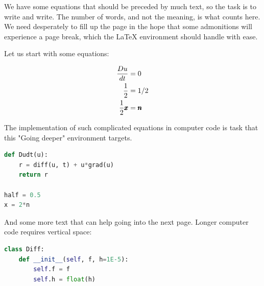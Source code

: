 \documentclass[%
oneside,                 %
final,                   %
10pt]{article}
\newenvironment{noticeshaded}
{\def\FrameCommand{\fboxsep=3mm\colorbox{colors1_notice_background}}
 \MakeFramed {\advance\hsize-\width \FrameRestore}}{\endMakeFramed}
\newenvironment{notice_colors1admon}[1][Notice]{
\begin{noticeshaded}
\noindent
\texttt{[image: latex\_figs/notice]}\ \ \   \textbf{#1}\\ \par
\vspace{-3mm}\nobreak\noindent\ignorespaces
}
{
\end{noticeshaded}
}
\begin{document}
\begin{notice_colors1admon}
We have some equations that should be preceded by much text, so the
task is to write and write. The number of words, and not the
meaning, is what counts here. We need desperately to fill up the
page in the hope that some admonitions will experience a page break,
which the {\LaTeX} environment should handle with ease.

Let us start with some equations:

\begin{align*}
\frac{Du}{dt} &= 0
\\
\frac{1}{2} &= 1/2\\
\frac{1}{2}\pmb{x} &= \pmb{n}
\end{align*}

The implementation of such complicated equations in computer
code is task that this "Going deeper" environment targets.








\begin{lstlisting}[language=python,style=simple,xleftmargin=2mm]
def Dudt(u):
    r = diff(u, t) + u*grad(u)
    return r

half = 0.5
x = 2*n

\end{lstlisting}

And some more text that can help going into the next page.
Longer computer code requires vertical space:








































\begin{lstlisting}[language=python,style=simple,xleftmargin=2mm]
class Diff:
    def __init__(self, f, h=1E-5):
        self.f = f
        self.h = float(h)


\end{lstlisting}
\end{notice_colors1admon}
\end{document}
